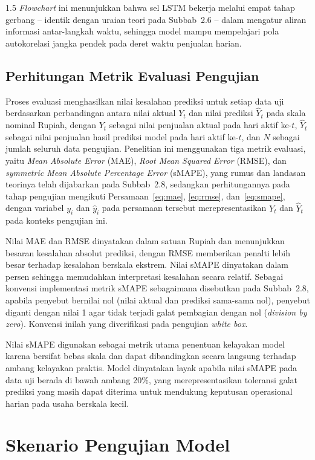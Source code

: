 \documentclass[12pt, a4paper, onecolumn, oneside]{report}
\begin{document}
\begin{spacing}{1.5}
\textit{Flowchart} ini menunjukkan bahwa sel LSTM bekerja melalui empat tahap gerbang -- identik dengan uraian teori pada Subbab~2.6 -- dalam mengatur aliran informasi antar-langkah waktu, sehingga model mampu mempelajari pola autokorelasi jangka pendek pada deret waktu penjualan harian.
\subsection{Perhitungan Metrik Evaluasi Pengujian}

Proses evaluasi menghasilkan nilai kesalahan prediksi untuk setiap data uji berdasarkan perbandingan antara nilai aktual $Y_t$ dan nilai prediksi $\hat{Y}_t$ pada skala nominal Rupiah, dengan $Y_t$ sebagai nilai penjualan aktual pada hari aktif ke-$t$, $\hat{Y}_t$ sebagai nilai penjualan hasil prediksi model pada hari aktif ke-$t$, dan $N$ sebagai jumlah seluruh data pengujian. Penelitian ini menggunakan tiga metrik evaluasi, yaitu \textit{Mean Absolute Error} (MAE), \textit{Root Mean Squared Error} (RMSE), dan \textit{symmetric Mean Absolute Percentage Error} (sMAPE), yang rumus dan landasan teorinya telah dijabarkan pada Subbab~2.8, sedangkan perhitungannya pada tahap pengujian mengikuti Persamaan~\ref{eq:mae}, \ref{eq:rmse}, dan~\ref{eq:smape}, dengan variabel $y_i$ dan $\hat{y}_i$ pada persamaan tersebut merepresentasikan $Y_t$ dan $\hat{Y}_t$ pada konteks pengujian ini.

Nilai MAE dan RMSE dinyatakan dalam satuan Rupiah dan menunjukkan besaran kesalahan absolut prediksi, dengan RMSE memberikan penalti lebih besar terhadap kesalahan berskala ekstrem. Nilai sMAPE dinyatakan dalam persen sehingga memudahkan interpretasi kesalahan secara relatif. Sebagai konvensi implementasi metrik sMAPE sebagaimana disebutkan pada Subbab~2.8, apabila penyebut bernilai nol (nilai aktual dan prediksi sama-sama nol), penyebut diganti dengan nilai 1 agar tidak terjadi galat pembagian dengan nol (\textit{division by zero}). Konvensi inilah yang diverifikasi pada pengujian \textit{white box}.

Nilai sMAPE digunakan sebagai metrik utama penentuan kelayakan model karena bersifat bebas skala dan dapat dibandingkan secara langsung terhadap ambang kelayakan praktis. Model dinyatakan layak apabila nilai sMAPE pada data uji berada di bawah ambang 20\%, yang merepresentasikan toleransi galat prediksi yang masih dapat diterima untuk mendukung keputusan operasional harian pada usaha berskala kecil.

\section{Skenario Pengujian Model}


\end{spacing}
\end{document}

